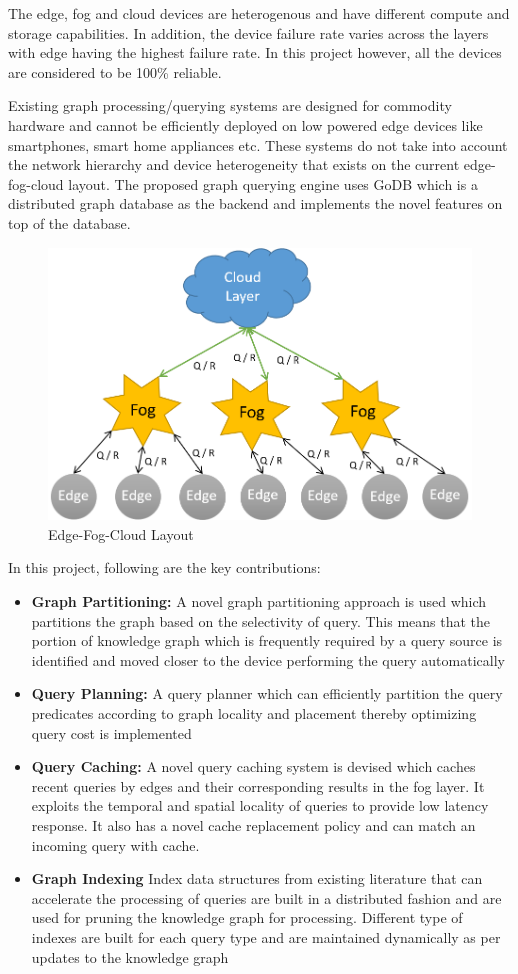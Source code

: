 \documentclass[conference]{IEEEtran}
\begin{document}
The edge, fog and cloud devices are heterogenous and have different compute and storage capabilities. In addition, the device failure rate varies across the layers with edge having the highest failure rate. In this project however, all the devices are considered to be 100\% reliable.

Existing graph processing/querying systems are designed for commodity hardware and cannot be efficiently deployed on low powered edge devices like smartphones, smart home appliances etc. These systems do not take into account the network hierarchy and device heterogeneity that exists on the current edge-fog-cloud layout. The proposed graph querying engine uses GoDB which is a distributed graph database as the backend and implements the novel features on top of the database.

\begin{figure}[!t]
	\centering
	\includegraphics[width=0.75\columnwidth]{1.png}
	\caption{Edge-Fog-Cloud Layout}
	\label{fig:1}
\end{figure}
In this project, following are the key contributions:
\begin{itemize}%
	\item \textbf{Graph Partitioning:} A novel graph partitioning approach is used which partitions the graph based on the selectivity of query. This means that the portion of knowledge graph which is frequently required by a query source is identified and moved closer to the device performing the query automatically 
	\item \textbf{Query Planning:} A query planner which can efficiently partition the query predicates according to graph locality and placement thereby optimizing query cost is implemented
	\item \textbf{Query Caching:} A novel query caching system is devised which caches recent queries by edges and their corresponding results in the fog layer. It exploits the temporal and spatial locality of queries to provide low latency response. It also has a novel cache replacement policy and can match an incoming query with cache. 
	\item \textbf{Graph Indexing} Index data structures from existing literature that can accelerate the processing of queries are built in a distributed fashion and are used for pruning the knowledge graph for processing. Different type of indexes are built for each query type and are maintained dynamically as per updates to the knowledge graph    
\end{itemize}
\end{document}
